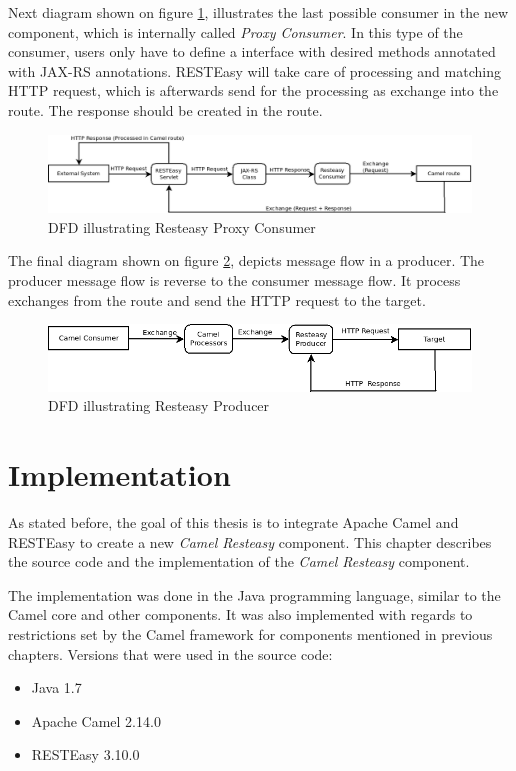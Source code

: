 \documentclass[12pt,final,oneside]{fithesis2}
\begin{document}
Next diagram shown on figure \ref{dfd-proxy}, illustrates the last possible consumer in the new component, which is internally called \textit{Proxy Consumer}. In this type of the consumer, users only have to define a interface with desired methods annotated with JAX-RS annotations. RESTEasy will take care of processing and matching HTTP request, which is afterwards send for the processing as exchange into the route. The response should be created in the route.  

\begin{figure}[h!]
\advance\leftskip-2cm
\includegraphics[width=1.3\linewidth]{diagrams/proxy.png}
\caption{DFD illustrating Resteasy Proxy Consumer}
\label{dfd-proxy}
\end{figure}

The final diagram shown on figure \ref{dfd-prod}, depicts message flow in a producer. The producer message flow is reverse to the consumer message flow. It process exchanges from the route and send the HTTP request to the target. 

\begin{figure}[h]
\advance\leftskip-1cm
\includegraphics[width=1.1\linewidth]{diagrams/producer.png}
\caption{DFD illustrating Resteasy Producer}
\label{dfd-prod}
\end{figure}


\chapter{Implementation}\label{impl}
As stated before, the goal of this thesis is to integrate Apache Camel and RESTEasy to create a new \textit{Camel Resteasy} component. This chapter describes the source code and the implementation of the \textit{Camel Resteasy} component. 

The implementation was done in the Java programming language, similar to the Camel core and other components. It was also implemented with regards to restrictions set by the Camel framework for components mentioned in previous chapters. Versions that were used in the source code:
\begin{itemize}
\item
Java 1.7

\item
Apache Camel 2.14.0

\item
RESTEasy 3.10.0
\end{itemize}
\end{document}
